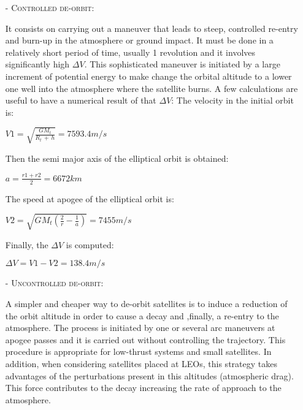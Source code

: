 \begin{itemize}

\item[-] \textsc{Controlled de-orbit:}


It consists on carrying out a maneuver that leads to steep, controlled re-entry and burn-up in the atmosphere or ground impact. It must be done in a relatively short period of time, usually 1 revolution and it involves significantly high $\Delta V$. This sophisticated maneuver is initiated by a large increment of potential energy to make change the orbital altitude to a lower one well into the atmosphere where the satellite burns. A few calculations are useful to have a numerical result of that  $\Delta V$:
The velocity in the initial orbit is: 
\newline
\begin{center}
$V1 = \sqrt{\frac{GM_t}{R_t\,+\,h}}  = 7593.4 m/s$
\newline
\end{center}
Then the semi major axis of the elliptical orbit is obtained: 
\newline
\begin{center}
$a = {\frac{r1+r2}{2}} = 6672 km$
\newline
\end{center}
The speed at apogee of the elliptical orbit is: 
\newline
\begin{center}
$V2 = \sqrt{GM_t(\frac{2}{r}-\frac{1}{a})} = 7455 m/s$
\newline
\end{center}
Finally, the $\Delta V$ is computed: 
\newline
\begin{center}
$\Delta V = V1-V2 = 138.4 m/s$
\end{center}

\item[-]  \textsc{Uncontrolled de-orbit:}

A simpler and cheaper way to de-orbit satellites is to induce a reduction of the orbit altitude in order to cause a decay and ,finally, a re-entry to the atmosphere. The process is initiated by one or several arc maneuvers at apogee passes and it is carried out without controlling the trajectory. This procedure is appropriate for low-thrust systems and small satellites. 
\newline
In addition, when considering satellites placed at LEOs, this strategy takes advantages of the perturbations present in this altitudes (atmospheric drag). This force contributes to the decay increasing the rate of approach to the atmosphere. 
\newline
\end{itemize} 
